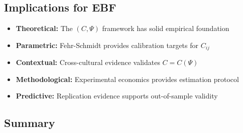\subsection{Implications for EBF}
\label{sec:EV-implications}

\begin{itemize}[nosep]
    \item \textbf{Theoretical:} The $(C, \Psi)$ framework has solid empirical foundation
    \item \textbf{Parametric:} Fehr-Schmidt provides calibration targets for $C_{ij}$
    \item \textbf{Contextual:} Cross-cultural evidence validates $C = C(\Psi)$
    \item \textbf{Methodological:} Experimental economics provides estimation protocol
    \item \textbf{Predictive:} Replication evidence supports out-of-sample validity
\end{itemize}



\subsection{Summary}
\label{sec:EV-summary}

